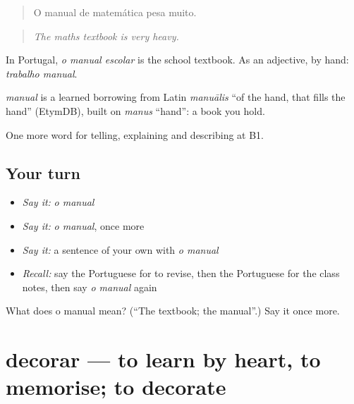 \begin{quote}
O manual de matemática pesa muito.
\end{quote}

\begin{quote}
\emph{The maths textbook is very heavy.}
\end{quote}

In Portugal, \emph{o manual escolar} is the school textbook. As an adjective, by hand: \emph{trabalho manual}.

\begin{cousinweb}
\emph{manual} is a learned borrowing from Latin \emph{manuālis} \textquotedblleft{}of the hand, that fills the hand\textquotedblright{} (EtymDB), built on \emph{manus} \textquotedblleft{}hand\textquotedblright{}: a book you hold.
\end{cousinweb}

\begin{grammarlens}[title={What you've built}]
One more word for telling, explaining and describing at B1.
\end{grammarlens}

\subsection*{Your turn}
\begin{itemize}
\raggedright
  \item \emph{Say it:} \emph{o manual}
  \item \emph{Say it:} \emph{o manual}, once more
  \item \emph{Say it:} a sentence of your own with \emph{o manual}
  \item \emph{Recall:} say the Portuguese for to revise, then the Portuguese for the class notes, then say \emph{o manual} again
\end{itemize}

\begin{tcolorbox}[breakable,colback=teal!4,colframe=teal!35!black,title={Before you move on}]
What does o manual mean? (\textquotedblleft{}The textbook; the manual\textquotedblright{}.) Say it once more.
\end{tcolorbox}
\section[decorar]{decorar — to learn by heart, to memorise; to decorate}

\label{lesson:PT-C378-decorar}



